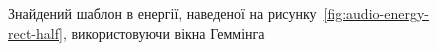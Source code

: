 \begin{figure}[h]

            \caption{Знайдений шаблон в енергії, наведеної на рисунку~\ref{fig:audio-energy-rect-half}, використовуючи
                вікна Геммінга}
            \label{fig:matched-energy-rect-half-hamming}
        \end{figure}

        \clearpage






